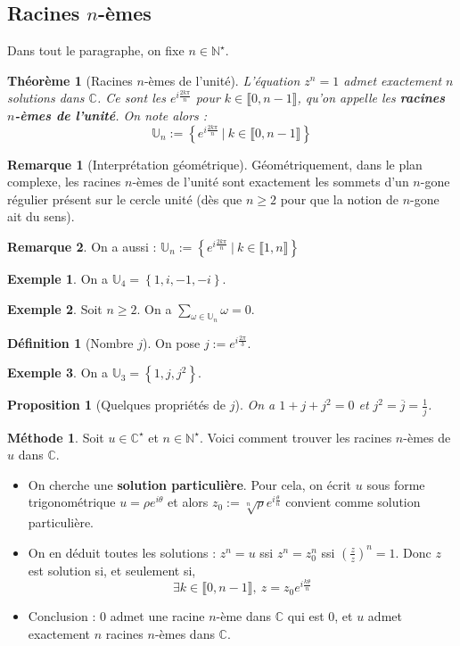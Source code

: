 \documentclass[french]{book}
\newcommand{\N}{\mathbb{N}}
\newcommand{\C}{\mathbb{C}}
\newcommand{\U}{\mathbb{U}}
\newcommand{\st}{^\star}
\theoremstyle{plain}
\newtheorem{thm}{Théorème}[chapter]
\newtheorem{prop}{Proposition}[chapter]
\theoremstyle{definition}
\newtheorem{dfn}{Définition}[chapter]
\newtheorem{exa}{Exemple}[chapter]
\newtheorem{rmq}{Remarque}[chapter]
\newtheorem{met}{Méthode}[chapter]
\theoremstyle{remark}
\begin{document}
\subsection{Racines $n$-èmes}
Dans tout le paragraphe, on fixe $n\in\N\st$.
\begin{thm}[Racines $n$-èmes de l'unité]
	L'équation $z^n=1$ admet exactement $n$ solutions dans $\C$. Ce sont les $ e^{i\frac{2k\pi}{n}}$ pour $k\in\llbracket0,n-1\rrbracket$, qu'on appelle les \textbf{racines $n$-èmes de l'unité}. On note alors : $$\U_n:=\displaystyle\left\{e^{i\frac{2k\pi}{n}}\ | \ k\in\llbracket0,n-1\rrbracket\right\}$$
\end{thm}
\begin{rmq}[Interprétation géométrique]
	Géométriquement, dans le plan complexe, les racines $n$-èmes de l'unité sont exactement les sommets d'un $n$-gone régulier présent sur le cercle unité (dès que $n\geqslant2$ pour que la notion de $n$-gone ait du sens).
\end{rmq}
\begin{rmq}
	On a aussi : $\U_n:=\displaystyle\left\{e^{i\frac{2k\pi}{n}}\ | \ k\in\llbracket1,n\rrbracket\right\}$
\end{rmq}
\begin{exa}
	On a $\U_4=\left\{1,i,-1,-i\right\}$.
\end{exa}
\begin{exa}
	Soit $n\geqslant2$. On a $\displaystyle\sum_{\omega\in\U_n}\omega=0$.
\end{exa}
\begin{dfn}[Nombre $j$]
	On pose $j:=e^{i\frac{2\pi}{3}}$.
\end{dfn}
\begin{exa}
	On a $\U_3=\left\{1,j,j^2\right\}$.
\end{exa}
\begin{prop}[Quelques propriétés de $j$]
	On a $1+j+j^2=0$ et $j^2=\overline{j}=\displaystyle\frac{1}{j}$.
\end{prop}
\begin{met}
	Soit $u\in\C\st$ et $n\in\N\st$. Voici comment trouver les racines $n$-èmes de $u$ dans $\C$.
	\begin{itemize}
		\item On cherche une \textbf{solution particulière}. Pour cela, on écrit $u$ sous forme trigonométrique $u=\rho e^{i\theta}$ et alors $z_0:=\sqrt[n]{\rho}e^{i\frac{\theta}{n}}$ convient comme solution particulière.
		\item On en déduit toutes les solutions : $z^n=u$ ssi $z^n=z_0^n$ ssi $\displaystyle\left(\frac{z}{z}\right)^n=1$. Donc $z$ est solution si, et seulement si, $$\exists k\in\llbracket0,n-1\rrbracket,\ z=z_0e^{i\frac{k\theta}{n}}$$
		\item Conclusion : $0$ admet une racine $n$-ème dans $\C$ qui est $0$, et $u$ admet exactement $n$ racines $n$-èmes dans $\C$.
	\end{itemize} 
\end{met}
\end{document}
